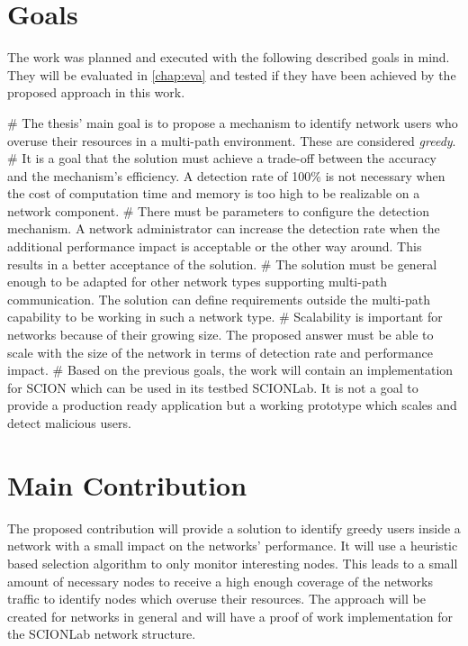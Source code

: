 \documentclass[thesis.tex]{subfiles}
\begin{document}
\section{Goals} \label{sec:intro:goals}

The work was planned and executed with the following described goals in mind. They will be evaluated in \autoref{chap:eva} and tested if they have been achieved by the proposed approach in this work.
     \begin{easylist}
        \MyNumberedListProperties
        # The thesis' main goal is to propose a mechanism to identify network users who overuse their resources in a multi-path environment. These are considered \textit{greedy}.
        # It is a goal that the solution must achieve a trade-off between the accuracy and the mechanism's efficiency. A detection rate of 100\% is not necessary when the cost of computation time and memory is too high to be realizable on a network component. 
        # There must be parameters to configure the detection mechanism. A network administrator can increase the detection rate when the additional performance impact is acceptable or the other way around. This results in a better acceptance of the solution.
        # The solution must be general enough to be adapted for other network types supporting multi-path communication. The solution can define requirements outside the multi-path capability to be working in such a network type.
        # Scalability is important for networks because of their growing size. The proposed answer must be able to scale with the size of the network in terms of detection rate and performance impact. 
        # Based on the previous goals, the work will contain an implementation for SCION which can be used in its testbed SCIONLab. It is not a goal to provide a production ready application but a working prototype which scales and detect malicious users.
    \end{easylist}

\section{Main Contribution}
The proposed contribution will provide a solution to identify greedy users inside a network with a small impact on the networks' performance. It will use a heuristic based selection algorithm to only monitor interesting nodes. This leads to a small amount of necessary nodes to receive a high enough coverage of the networks traffic to identify nodes which overuse their resources. The approach will be created for networks in general and will have a proof of work implementation for the SCIONLab network structure.
\end{document}
